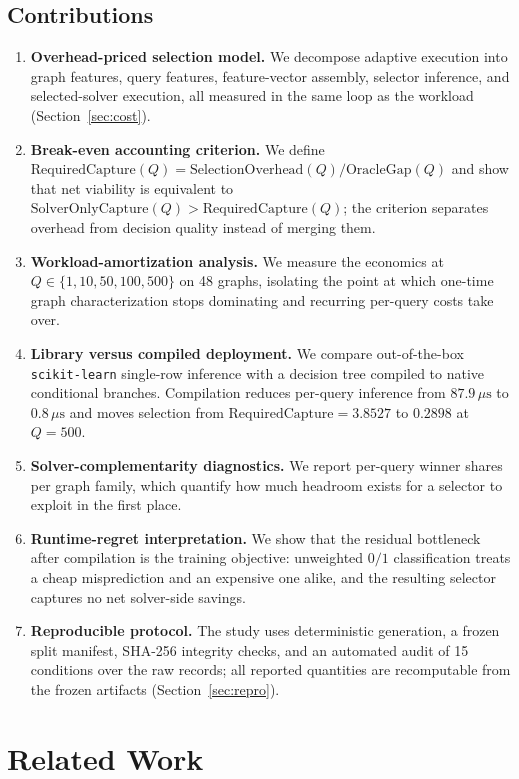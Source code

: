 \documentclass[conference]{IEEEtran}
\begin{document}
\subsection*{Contributions}
\begin{enumerate}
    \item \textbf{Overhead-priced selection model.} We decompose adaptive execution into graph features, query features, feature-vector assembly, selector inference, and selected-solver execution, all measured in the same loop as the workload (Section~\ref{sec:cost}).
    \item \textbf{Break-even accounting criterion.} We define $\mathrm{RequiredCapture}(Q) = \mathrm{SelectionOverhead}(Q)/\mathrm{OracleGap}(Q)$ and show that net viability is equivalent to $\mathrm{SolverOnlyCapture}(Q) > \mathrm{RequiredCapture}(Q)$; the criterion separates overhead from decision quality instead of merging them.
    \item \textbf{Workload-amortization analysis.} We measure the economics at $Q \in \{1,10,50,100,500\}$ on 48 graphs, isolating the point at which one-time graph characterization stops dominating and recurring per-query costs take over.
    \item \textbf{Library versus compiled deployment.} We compare out-of-the-box \texttt{scikit-learn} single-row inference with a decision tree compiled to native conditional branches. Compilation reduces per-query inference from $87.9\,\mu\mathrm{s}$ to $0.8\,\mu\mathrm{s}$ and moves selection from $\mathrm{RequiredCapture} = 3.8527$ to $0.2898$ at $Q=500$.
    \item \textbf{Solver-complementarity diagnostics.} We report per-query winner shares per graph family, which quantify how much headroom exists for a selector to exploit in the first place.
    \item \textbf{Runtime-regret interpretation.} We show that the residual bottleneck after compilation is the training objective: unweighted $0/1$ classification treats a cheap misprediction and an expensive one alike, and the resulting selector captures no net solver-side savings.
    \item \textbf{Reproducible protocol.} The study uses deterministic generation, a frozen split manifest, SHA-256 integrity checks, and an automated audit of 15 conditions over the raw records; all reported quantities are recomputable from the frozen artifacts (Section~\ref{sec:repro}).
\end{enumerate}

\section{Related Work}
\end{document}
